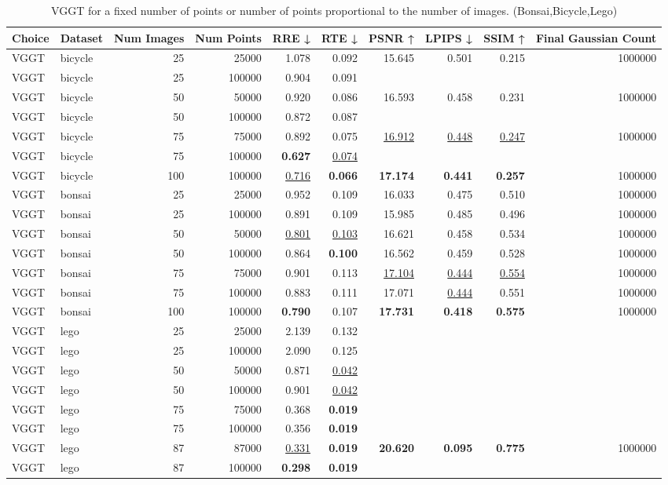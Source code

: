 \begin{table}[H]
\caption{VGGT for a fixed number of points or number of points proportional to the number of images. (Bonsai,Bicycle,Lego)}
\label{tab:01_num_images_fixed_points_bonsai,bicycle,lego}
\small
\begin{tabular}{llrrrrrrrr}
\toprule
Choice & Dataset & Num Images & Num Points & RRE ↓ & RTE ↓ & PSNR ↑ & LPIPS ↓ & SSIM ↑ & Final Gaussian Count \\
\midrule
VGGT & bicycle & 25 & 25000 & 1.078 & 0.092 & 15.645 & 0.501 & 0.215 & 1000000 \\
VGGT & bicycle & 25 & 100000 & 0.904 & 0.091 &  &  &  &  \\
VGGT & bicycle & 50 & 50000 & 0.920 & 0.086 & 16.593 & 0.458 & 0.231 & 1000000 \\
VGGT & bicycle & 50 & 100000 & 0.872 & 0.087 &  &  &  &  \\
VGGT & bicycle & 75 & 75000 & 0.892 & 0.075 & \underline{16.912} & \underline{0.448} & \underline{0.247} & 1000000 \\
VGGT & bicycle & 75 & 100000 & \textbf{0.627} & \underline{0.074} &  &  &  &  \\
VGGT & bicycle & 100 & 100000 & \underline{0.716} & \textbf{0.066} & \textbf{17.174} & \textbf{0.441} & \textbf{0.257} & 1000000 \\
\midrule
VGGT & bonsai & 25 & 25000 & 0.952 & 0.109 & 16.033 & 0.475 & 0.510 & 1000000 \\
VGGT & bonsai & 25 & 100000 & 0.891 & 0.109 & 15.985 & 0.485 & 0.496 & 1000000 \\
VGGT & bonsai & 50 & 50000 & \underline{0.801} & \underline{0.103} & 16.621 & 0.458 & 0.534 & 1000000 \\
VGGT & bonsai & 50 & 100000 & 0.864 & \textbf{0.100} & 16.562 & 0.459 & 0.528 & 1000000 \\
VGGT & bonsai & 75 & 75000 & 0.901 & 0.113 & \underline{17.104} & \underline{0.444} & \underline{0.554} & 1000000 \\
VGGT & bonsai & 75 & 100000 & 0.883 & 0.111 & 17.071 & \underline{0.444} & 0.551 & 1000000 \\
VGGT & bonsai & 100 & 100000 & \textbf{0.790} & 0.107 & \textbf{17.731} & \textbf{0.418} & \textbf{0.575} & 1000000 \\
\midrule
VGGT & lego & 25 & 25000 & 2.139 & 0.132 &  &  &  &  \\
VGGT & lego & 25 & 100000 & 2.090 & 0.125 &  &  &  &  \\
VGGT & lego & 50 & 50000 & 0.871 & \underline{0.042} &  &  &  &  \\
VGGT & lego & 50 & 100000 & 0.901 & \underline{0.042} &  &  &  &  \\
VGGT & lego & 75 & 75000 & 0.368 & \textbf{0.019} &  &  &  &  \\
VGGT & lego & 75 & 100000 & 0.356 & \textbf{0.019} &  &  &  &  \\
VGGT & lego & 87 & 87000 & \underline{0.331} & \textbf{0.019} & \textbf{20.620} & \textbf{0.095} & \textbf{0.775} & 1000000 \\
VGGT & lego & 87 & 100000 & \textbf{0.298} & \textbf{0.019} &  &  &  &  \\
\bottomrule
\end{tabular}
\end{table}
